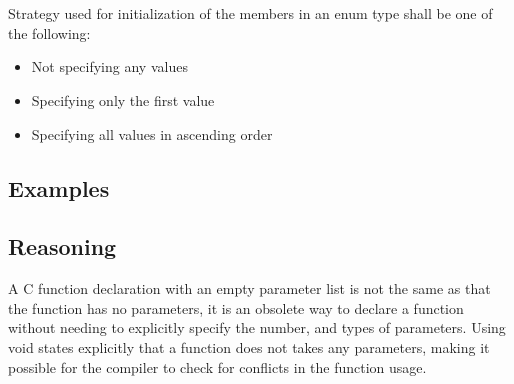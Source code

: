 \section*{\codingRule{}}

Strategy used for initialization of the members in an enum type shall be one of the following:
\begin{itemize}
    \item Not specifying any values
    \item Specifying only the first value
    \item Specifying all values in ascending order
\end{itemize}
\subsection*{Examples}

\noindent
\begin{minipage}[t]{\codelstwidth\linewidth}
    
\end{minipage}
\hfill
\begin{minipage}[t]{\codelstwidth\linewidth}
    
\end{minipage}

\subsection*{Reasoning}

A C function declaration with an empty parameter list is not the same as that the function has no parameters, it is an obsolete way to declare a function without needing to explicitly specify the number, and types of parameters. Using void states explicitly that a function does not takes any parameters, making it possible for the compiler to check for conflicts in the function usage.

